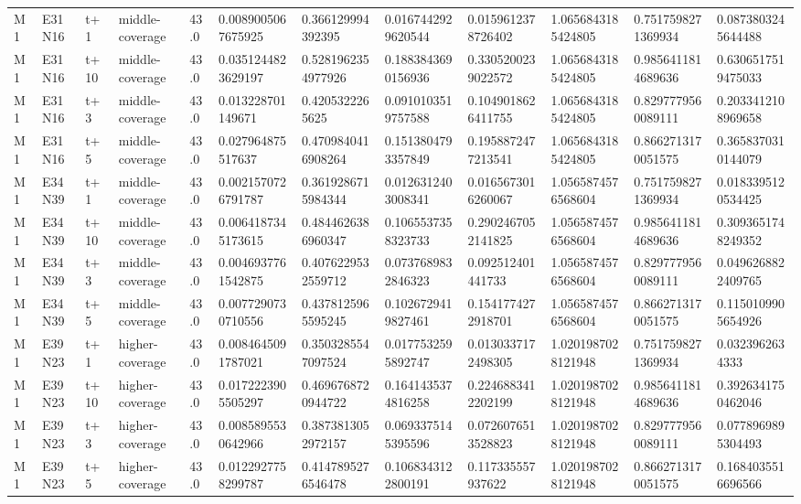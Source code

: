 \begin{landscape}
\begin{longtable}{llllllllllll}
M1 & E31N16 & t+1 & middle-coverage & 43.0 & 0.0089005067675925 & 0.366129994392395 & 0.0167442929620544 & 0.0159612378726402 & 1.0656843185424805 & 0.7517598271369934 & 0.0873803245644488 \\
M1 & E31N16 & t+10 & middle-coverage & 43.0 & 0.0351244823629197 & 0.5281962354977926 & 0.1883843690156936 & 0.3305200239022572 & 1.0656843185424805 & 0.9856411814689636 & 0.6306517519475033 \\
M1 & E31N16 & t+3 & middle-coverage & 43.0 & 0.013228701149671 & 0.4205322265625 & 0.0910103519757588 & 0.1049018626411755 & 1.0656843185424805 & 0.8297779560089111 & 0.2033412108969658 \\
M1 & E31N16 & t+5 & middle-coverage & 43.0 & 0.027964875517637 & 0.4709840416908264 & 0.1513804793357849 & 0.1958872477213541 & 1.0656843185424805 & 0.8662713170051575 & 0.3658370310144079 \\
M1 & E34N39 & t+1 & middle-coverage & 43.0 & 0.0021570726791787 & 0.3619286715984344 & 0.0126312403008341 & 0.0165673016260067 & 1.0565874576568604 & 0.7517598271369934 & 0.0183395120534425 \\
M1 & E34N39 & t+10 & middle-coverage & 43.0 & 0.0064187345173615 & 0.4844626386960347 & 0.1065537358323733 & 0.2902467052141825 & 1.0565874576568604 & 0.9856411814689636 & 0.3093651748249352 \\
M1 & E34N39 & t+3 & middle-coverage & 43.0 & 0.0046937761542875 & 0.4076229532559712 & 0.0737689832846323 & 0.092512401441733 & 1.0565874576568604 & 0.8297779560089111 & 0.0496268822409765 \\
M1 & E34N39 & t+5 & middle-coverage & 43.0 & 0.0077290730710556 & 0.4378125965595245 & 0.1026729419827461 & 0.1541774272918701 & 1.0565874576568604 & 0.8662713170051575 & 0.1150109905654926 \\
M1 & E39N23 & t+1 & higher-coverage & 43.0 & 0.0084645091787021 & 0.3503285547097524 & 0.0177532595892747 & 0.0130337172498305 & 1.0201987028121948 & 0.7517598271369934 & 0.0323962634333 \\
M1 & E39N23 & t+10 & higher-coverage & 43.0 & 0.0172223905505297 & 0.4696768720944722 & 0.1641435374816258 & 0.2246883412202199 & 1.0201987028121948 & 0.9856411814689636 & 0.3926341750462046 \\
M1 & E39N23 & t+3 & higher-coverage & 43.0 & 0.0085895530642966 & 0.3873813052972157 & 0.0693375145395596 & 0.0726076513528823 & 1.0201987028121948 & 0.8297779560089111 & 0.0778969895304493 \\
M1 & E39N23 & t+5 & higher-coverage & 43.0 & 0.0122927758299787 & 0.4147895276546478 & 0.1068343122800191 & 0.117335557937622 & 1.0201987028121948 & 0.8662713170051575 & 0.1684035516696566 \\

\end{longtable}
\end{landscape}
